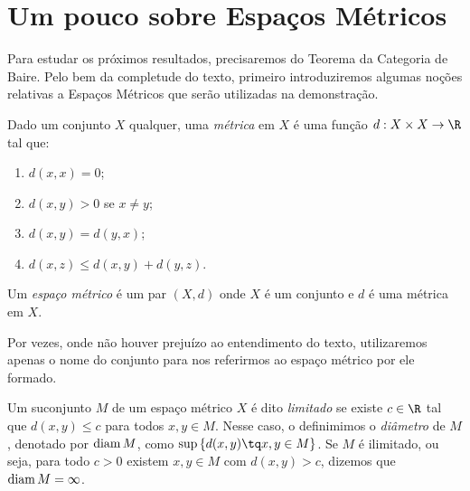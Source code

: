 \section{Um pouco sobre Espaços Métricos}

Para estudar os próximos resultados, precisaremos do Teorema da Categoria de Baire.
Pelo bem da completude do texto, primeiro introduziremos algumas noções relativas a Espaços Métricos que serão utilizadas na demonstração.

\begin{defn}
    Dado um conjunto \( X \) qualquer, uma \emph{métrica} em \( X \) é uma função \( d : X \times X \to \R \) tal que:
    \begin{enumerate}[label=\roman*)]
        \item \( d(x, x) = 0 \);
        \item \( d(x, y) > 0 \) se \( x \neq y \);
        \item \( d(x, y) = d(y, x) \);
        \item \( d(x, z) \leq d(x, y) + d(y, z) \).
    \end{enumerate}
\end{defn}


\begin{defn}
    Um \emph{espaço métrico} é um par \( ( X, d ) \) onde \( X \) é um conjunto e \( d \) é uma métrica em \( X \).
\end{defn}

    Por vezes, onde não houver prejuízo ao entendimento do texto, utilizaremos apenas o nome do conjunto para nos referirmos ao espaço métrico por ele formado.

\begin{defn}
    Um suconjunto \( M \) de um espaço métrico \( X \) é dito \emph{limitado} se existe \( c \in \R \) tal que \( d(x, y) \leq c \) para todos \( x, y \in M \).
    Nesse caso, o definimimos o \emph{diâmetro} de \( M \), denotado por \( \operatorname{diam} M \), como \( \sup \left\{ d(x, y) \tq x, y \in M \right\} \).
    Se \( M \) é ilimitado, ou seja, para todo \( c > 0 \) existem \( x, y \in M \) com \( d(x, y) > c \), dizemos que \( \operatorname{diam} M = \infty \).
\end{defn}


